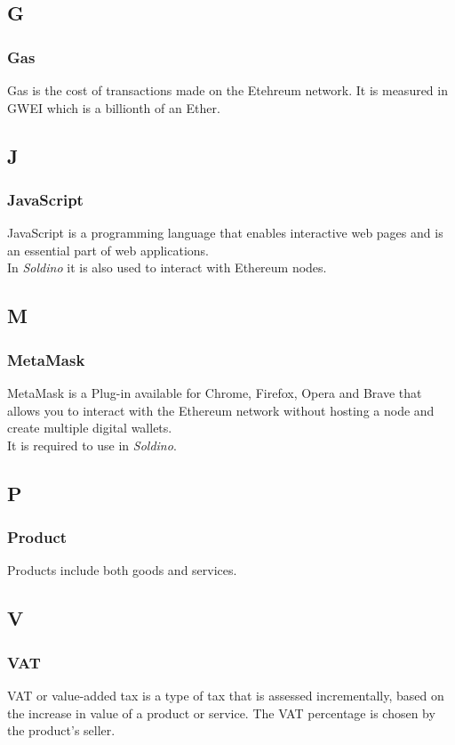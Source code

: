 	\subsection*{G}
		\subsubsection*{Gas}
		Gas is the cost of transactions made on the Etehreum network. It is 
		measured in GWEI which is a billionth of an Ether.
		
	\subsection*{J}
		\subsubsection*{JavaScript}
		JavaScript is a programming language that enables interactive web pages 
		and is an essential part of web applications.\\
		In \textit{Soldino} it is also used to interact with Ethereum nodes.
		
	\subsection*{M}
		\subsubsection*{MetaMask}
		MetaMask is a Plug-in available for Chrome, Firefox, Opera and Brave that 
		allows you to interact with the Ethereum network without hosting a node 
		and create multiple digital wallets\glo.
		\\It is required to use in \textit{Soldino}.
		
	\subsection*{P}
		\subsubsection*{Product}
		Products include both goods and services.
		
	\subsection*{V}
		\subsubsection*{VAT}
		VAT or value-added tax is a type of tax that is assessed incrementally, 
		based on the increase in value of a product or service. The VAT 
		percentage is chosen by the product's seller.